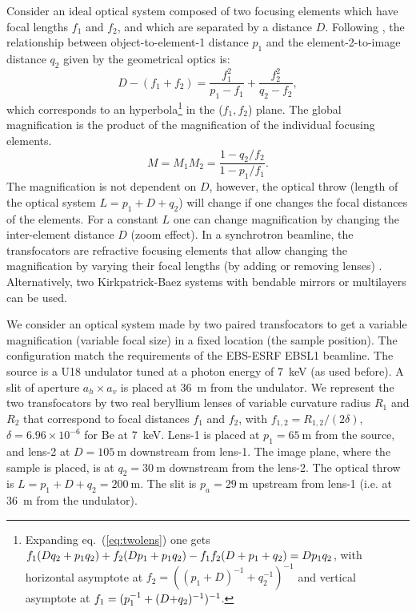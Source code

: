 \documentclass[doublecol]{epl2}
\newcommand{\inred}[1]{{\color{black}#1}} %
\begin{document}
Consider an ideal optical system composed \inred{of} two focusing elements \inred{which have} focal lengths $f_1$ and $f_2$, \inred{ and which are} separated by a distance $D$. Following \cite{Goodman85}, the relationship between object-to-element-1 distance $p_1$ and the element-2-to-image distance $q_2$ given by the geometrical optics is:
\begin{equation}
\label{eq:twolens}
    D-(f_1+f_2)=\frac{f_1^2}{p_1-f_1} + \frac{f_2^2}{q_2-f_2},
\end{equation}
which corresponds to an hyperbola\footnote{Expanding eq.~\inred{(}\ref{eq:twolens}\inred{)} one gets $\inred{f_1}(D q_2 + p_1 q_2) + \inred{f_2} (D p_1 + p_1 q_2) - \inred{f_1 f_2} (D + p\inred{_1} + q_2) = D p_1 q_2$,  with horizontal asymptote at $f_{2}=((p_1+D)^{-1}+q_2^{-1})^{-1}$ and vertical asymptote at $f_{1}=(p_1^{-1}+\inred{(}D\inred{+q_2)}^{-1})^{-1}$.


} in the ($f_1,f_2$) plane.
The global magnification is the product of the magnification of the individual focusing elements.
\begin{equation}
\label{eq:magnification}
    M=M_1 M_2=\frac{1-q_2/f_2}{1-p_1/f_1}.
\end{equation}
The magnification is not dependent on $D$, however\inred{,} the optical throw (length of the optical system $L=p_1+D+q_2$) will change if one changes the focal distances of the elements. For a constant $L$ one can change magnification by changing the inter-element distance $D$ (zoom effect). In a synchrotron beamline, the transfocators are refractive focusing elements that allow changing the magnification by varying their focal lengths (by adding or removing lenses) \cite{Vaughan:kv5084}. Alternatively, two Kirkpatrick-Baez systems with bendable mirrors or multilayers can be used. 

We consider an optical system made by two paired transfocators to get a variable magnification (variable focal size) in a fixed location (the sample position). The configuration match the requirements of the EBS-ESRF EBSL1 beamline. 
The source is a U18 undulator tuned at \inred{a} photon energy of \SI{7}{keV} (as used before). A slit of aperture $a_h \times a_v$ is placed at \SI{36}{\meter} from the undulator.  
We represent the two transfocators by two real beryllium lenses of variable curvature radius $R_1$ and $R_2$ that correspond to focal distances $f_1$ and $f_2$, with $f_{1,2}=R_{1,2}/(2 \delta)$, $\delta=6.96\times10^{-6}$ for Be at \SI{7}{keV}. Lens-1 is placed at $p_1=\SI{65}{\meter}$ from the source, and lens-2 at $D=\SI{105}{\meter}$ downstream from lens-1. The image plane, where \inred{the} sample is placed, is at $q_2=\SI{30}{\meter}$ downstream from the lens-2. The optical throw is $L=p_1+D+q_2=\SI{200}{\meter}$. The slit is $p_a=\SI{29}{\meter}$ upstream from lens-1 (i.e. at \SI{36}{\meter} from the undulator). 
\end{document}
